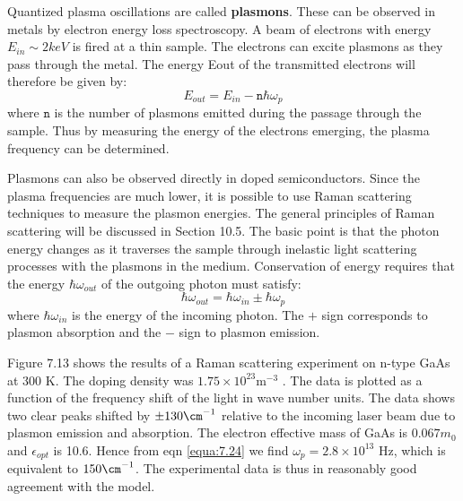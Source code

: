 \documentclass[12pt]{book}
\begin{document}
{Quantized plasma oscillations are called \textbf{plasmons}. These can be observed in metals by electron energy loss spectroscopy. A beam of electrons with energy $E_{in}\sim2 keV$ is fired at a thin sample. The electrons can excite plasmons as they pass through the metal. The energy Eout of the transmitted electrons
will therefore be given by:
\begin{equation}\label{equa:7.33}
  E_{out}=E_{in}-\texttt{n}\hbar\omega_p
\end{equation}
where $\texttt{n}$ is the number of plasmons emitted during the passage through the sample. Thus by measuring the energy of the electrons emerging, the plasma frequency can be determined.

Plasmons can also be observed directly in doped semiconductors. Since the plasma frequencies are much lower, it is possible to use Raman scattering techniques to measure the plasmon energies. The general principles of Raman scattering will be discussed in Section 10.5. The basic point is that the photon energy changes as it traverses the sample through inelastic light scattering processes with the plasmons in the medium. Conservation of energy requires that the energy $\hbar\omega_{out}$ of the outgoing photon must satisfy:
\begin{equation}\label{equa:7.34}
  \hbar\omega_{out}=\hbar\omega_{in}\pm\hbar\omega_p
\end{equation}
where $\hbar\omega_{in}$ is the energy of the incoming photon. The $+$ sign corresponds to plasmon absorption and the $-$ sign to plasmon emission.

Figure 7.13 shows the results of a Raman scattering experiment on n-type GaAs at 300 K. The doping density was $1.75\times10^{23}\mathrm{m^{-3}}$ . The data is plotted as a function of the frequency shift of the light in wave number units. The data shows two clear peaks shifted by $\pm130\cm^{-1}$ relative to the incoming laser beam due to plasmon emission and absorption. The electron effective mass of GaAs is $0.067m_0$ and $\epsilon_{opt}$ is 10.6. Hence from eqn \ref{equa:7.24} we find $\omega_p=2.8\times10^{13}$ Hz, which is equivalent to $150\cm^{-1}$. The experimental data is thus in reasonably good agreement with the model.

}
\end{document}
